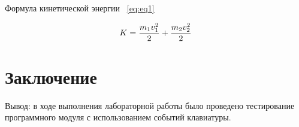     \item Формула кинетической энергии  ~\ref{eq:eq1}

    
    \begin{equation}
        \centering
        \label{eq:eq1}
        K=\frac{m_{1}v_{1}^{2}}{2} + \frac{m_{2}v_{2}^{2}}{2}
    \end{equation}
    
\newpage
\section{Заключение}
Вывод: в ходе выполнения лабораторной работы было проведено тестирование программного модуля с использованием событий клавиатуры.
